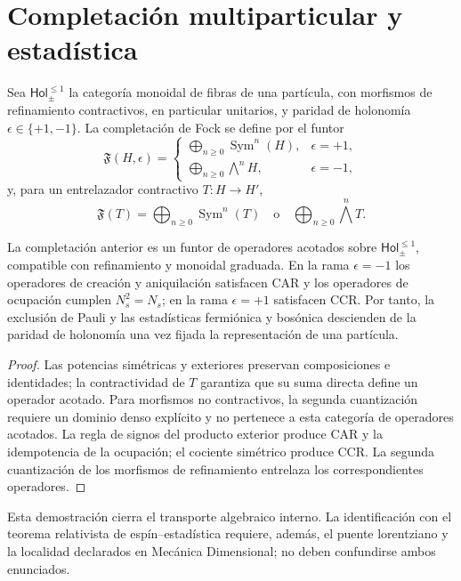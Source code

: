 \section{Completación multiparticular y estadística}

Sea \(\mathsf{Hol}_{\pm}^{\leq1}\) la categoría monoidal de fibras de una
partícula, con morfismos de refinamiento contractivos, en particular unitarios,
y paridad de holonomía
\(\epsilon\in\{+1,-1\}\). La completación de Fock se define por el funtor
\[
 \mathfrak F(H,\epsilon)=
 \begin{cases}
 \displaystyle\bigoplus_{n\ge0}\operatorname{Sym}^n(H),
     &\epsilon=+1,\\[2mm]
 \displaystyle\bigoplus_{n\ge0}\bigwedge^n\!H,
     &\epsilon=-1,
 \end{cases}
\]
y, para un entrelazador contractivo \(T:H\to H'\),
\[
 \mathfrak F(T)=
 \bigoplus_{n\ge0}\operatorname{Sym}^n(T)
 \quad\text{o}\quad
 \bigoplus_{n\ge0}\bigwedge^n\!T.
\]

\begin{theorem}
La completación anterior es un funtor de operadores acotados sobre
\(\mathsf{Hol}_{\pm}^{\leq1}\), compatible con refinamiento y
monoidal graduada. En la rama \(\epsilon=-1\) los operadores de creación y
aniquilación satisfacen CAR y los operadores de ocupación cumplen
\(N_s^2=N_s\); en la rama \(\epsilon=+1\) satisfacen CCR. Por tanto, la
exclusión de Pauli y las estadísticas fermiónica y bosónica descienden de la
paridad de holonomía una vez fijada la representación de una partícula.
\end{theorem}

\begin{proof}
Las potencias simétricas y exteriores preservan composiciones e identidades;
la contractividad de \(T\) garantiza que su suma directa define un operador
acotado. Para morfismos no contractivos, la segunda cuantización requiere un
dominio denso explícito y no pertenece a esta categoría de operadores acotados.
La regla de signos del producto exterior produce CAR y la idempotencia de la
ocupación; el cociente simétrico produce CCR. La segunda cuantización de los
morfismos de refinamiento entrelaza los correspondientes operadores.
\end{proof}

Esta demostración cierra el transporte algebraico interno. La identificación
con el teorema relativista de espín--estadística requiere, además, el puente
lorentziano y la localidad declarados en Mecánica Dimensional; no deben
confundirse ambos enunciados.

